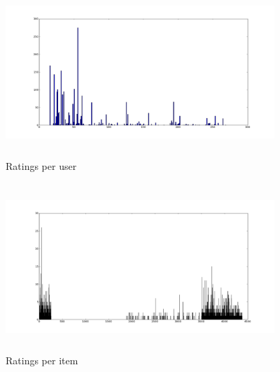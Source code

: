 \documentclass{article}
\begin{document}
\begin{figure}[H]
\centering
\includegraphics[height=2.5in, width=4in]{ratingsperuser.png}
\caption{Ratings per user}
\label{ruser}
\end{figure}

\begin{figure}[H]
\centering
\includegraphics[height=2.5in, width=4in]{ratungspermovie.png}
\caption{Ratings per item}
\label{ritem}
\end{figure}



\end{document}
